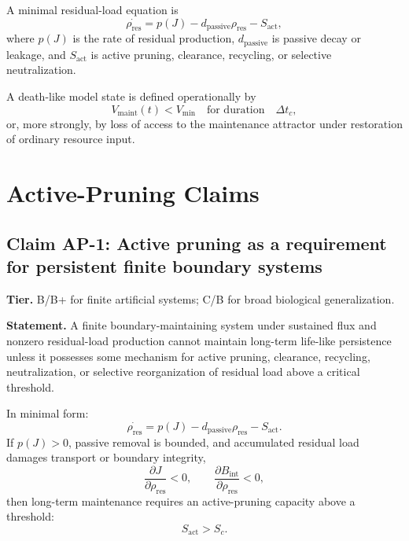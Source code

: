 \documentclass[10pt,a4paper,twocolumn,aps,prl]{revtex4-2}
\theoremstyle{claimstyle}
\theoremstyle{definition}
\newcommand{\claimfield}[1]{\noindent\textbf{#1.}}
\newcommand{\Sactive}{S_{\mathrm{act}}}
\newcommand{\rhodebt}{\rho_{\mathrm{res}}}
\newcommand{\Bint}{B_{\mathrm{int}}}
\newcommand{\Jflow}{J}
\newcommand{\Vlife}{V_{\mathrm{maint}}}
\begin{document}
A minimal residual-load equation is
\begin{equation}
    \dot{\rhodebt}=p(\Jflow)-d_{\mathrm{passive}}\rhodebt-\Sactive,
\end{equation}
where $p(\Jflow)$ is the rate of residual production, $d_{\mathrm{passive}}$ is passive decay or leakage, and $\Sactive$ is active pruning, clearance, recycling, or selective neutralization.

A death-like model state is defined operationally by
\begin{equation}
    \Vlife(t)<V_{\min}\quad \text{for duration}\quad \Delta t_c,
\end{equation}
or, more strongly, by loss of access to the maintenance attractor under restoration of ordinary resource input.

\section{Active-Pruning Claims}

\subsection{Claim AP-1: Active pruning as a requirement for persistent finite boundary systems}

\claimfield{Tier} B/B+ for finite artificial systems; C/B for broad biological generalization.

\claimfield{Statement} A finite boundary-maintaining system under sustained flux and nonzero residual-load production cannot maintain long-term life-like persistence unless it possesses some mechanism for active pruning, clearance, recycling, neutralization, or selective reorganization of residual load above a critical threshold.

In minimal form:
\begin{equation}
\dot{\rhodebt}=p(\Jflow)-d_{\mathrm{passive}}\rhodebt-\Sactive.
\end{equation}
If $p(\Jflow)>0$, passive removal is bounded, and accumulated residual load damages transport or boundary integrity,
\begin{equation}
    \frac{\partial \Jflow}{\partial \rhodebt}<0,\qquad
    \frac{\partial \Bint}{\partial \rhodebt}<0,
\end{equation}
then long-term maintenance requires an active-pruning capacity above a threshold:
\begin{equation}
    \Sactive > S_c.
\end{equation}
\end{document}
